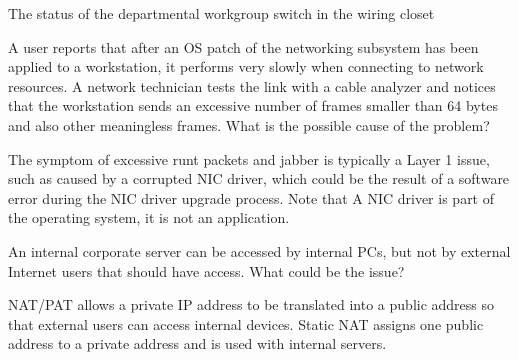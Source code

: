\begin{solution}
The status of the departmental workgroup switch in the wiring closet
\end{solution}

\begin{example}
A user reports that after an OS patch of the networking subsystem has been applied to a workstation, it performs very slowly when connecting to network resources. A network technician tests the link with a cable analyzer and notices that the workstation sends an excessive number of frames smaller than 64 bytes and also other meaningless frames. What is the possible cause of the problem?
\end{example}

\begin{solution}
The symptom of excessive runt packets and jabber is typically a Layer 1 issue, such as caused by a corrupted NIC driver, which could be the result of a software error during the NIC driver upgrade process. Note that  A NIC driver is part of the operating system, it is not an application.
\end{solution}

\begin{example}
An internal corporate server can be accessed by internal PCs, but not by external Internet users that should have access. What could be the issue?
\end{example}

\begin{solution}
NAT/PAT allows a private IP address to be translated into a public address so that external users can access internal devices. Static NAT assigns one public address to a private address and is used with internal servers.
\end{solution}
